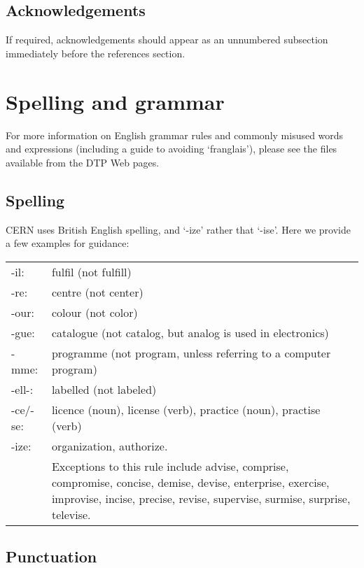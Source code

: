 \documentclass[12pt,twoside,a4paper]{cernrep}
\begin{document}
\subsection{Acknowledgements}

If required, acknowledgements should appear as an unnumbered
subsection immediately before the references section.

\section{Spelling and grammar}

For more information on English grammar rules and commonly misused
words and expressions (including a guide to avoiding `franglais'),
please see the files available from the DTP Web pages.

\subsection{Spelling}

CERN uses British English spelling, and `-ize' rather that
`-ise'. Here we provide a few examples for guidance:
\begin{flushleft}
\begin{tabularx}{\linewidth}{@{}lX}
-il:     & fulfil (not fulfill) \\
-re:     & centre (not center) \\
-our:    & colour (not color) \\ 
-gue:    & catalogue (not catalog, but analog is used in electronics) \\ 
-mme:    & programme (not program, unless referring to a computer
           program) \\ 
-ell-:   & labelled (not labeled) \\ 
-ce/-se: & licence (noun), license (verb), practice (noun), practise (verb) \\ 
-ize:    & organization, authorize. \\
         & Exceptions to this rule include advise, comprise, compromise, 
           concise, demise, devise, enterprise, exercise, improvise, 
           incise, precise, revise, supervise, surmise, surprise, televise.\\
\end{tabularx}
\end{flushleft}

\subsection{Punctuation}
\end{document}
